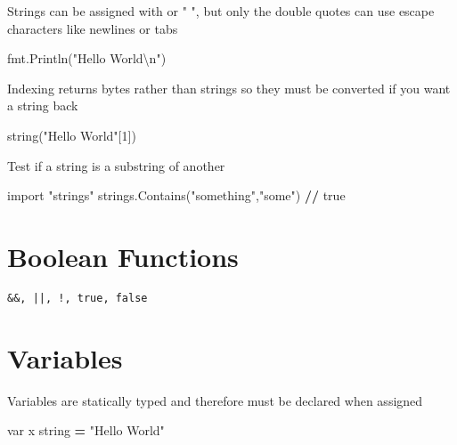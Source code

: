 \documentclass[]{book}
\newenvironment{Shaded}{\begin{snugshade}}{\end{snugshade}}
\newcommand{\CharTok}[1]{\textcolor[rgb]{0.31,0.60,0.02}{#1}}
\newcommand{\DecValTok}[1]{\textcolor[rgb]{0.00,0.00,0.81}{#1}}
\newcommand{\ImportTok}[1]{#1}
\newcommand{\NormalTok}[1]{#1}
\newcommand{\OperatorTok}[1]{\textcolor[rgb]{0.81,0.36,0.00}{\textbf{#1}}}
\newcommand{\StringTok}[1]{\textcolor[rgb]{0.31,0.60,0.02}{#1}}
\begin{document}
Strings can be assigned with \texttt{} or " ", but only the double quotes can use escape characters like newlines or tabs

\begin{Shaded}
\begin{Highlighting}[]
\NormalTok{fmt.Println(}\StringTok{"Hello World}\CharTok{\textbackslash{}n}\StringTok{"}\NormalTok{)}
\end{Highlighting}
\end{Shaded}

Indexing returns bytes rather than strings so they must be converted if you want a string back

\begin{Shaded}
\begin{Highlighting}[]
\NormalTok{string(}\StringTok{"Hello World"}\NormalTok{[}\DecValTok{1}\NormalTok{])}
\end{Highlighting}
\end{Shaded}

Test if a string is a substring of another

\begin{Shaded}
\begin{Highlighting}[]
\ImportTok{import} \StringTok{"strings"}
\NormalTok{strings.Contains(}\StringTok{"something"}\NormalTok{,}\StringTok{"some"}\NormalTok{) }\OperatorTok{//}\NormalTok{ true}
\end{Highlighting}
\end{Shaded}

\hypertarget{boolean-functions}{%
\section{Boolean Functions}\label{boolean-functions}}

\begin{verbatim}
&&, ||, !, true, false
\end{verbatim}

\hypertarget{variables}{%
\section{Variables}\label{variables}}

Variables are statically typed and therefore must be declared when assigned

\begin{Shaded}
\begin{Highlighting}[]
\NormalTok{var x string }\OperatorTok{=} \StringTok{"Hello World"}
\end{Highlighting}
\end{Shaded}
\end{document}
